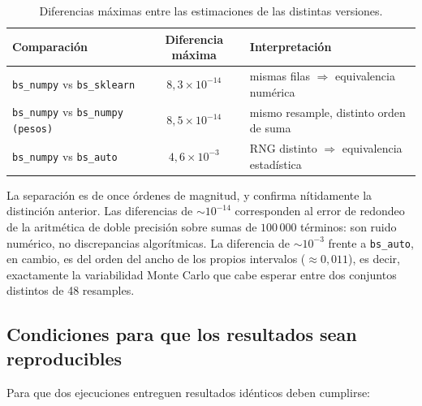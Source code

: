 \documentclass[11pt,letterpaper]{article}
\begin{document}
\begin{table}[H]
\centering
\caption{Diferencias máximas entre las estimaciones de las distintas versiones.}
\label{tab:equivalencia}
\small
\begin{tabular}{lcl}
\toprule
\textbf{Comparación} & \textbf{Diferencia máxima} & \textbf{Interpretación} \\
\midrule
\texttt{bs\_numpy} vs \texttt{bs\_sklearn}       & $8{,}3 \times 10^{-14}$ & mismas filas $\Rightarrow$ equivalencia numérica \\
\texttt{bs\_numpy} vs \texttt{bs\_numpy (pesos)} & $8{,}5 \times 10^{-14}$ & mismo resample, distinto orden de suma \\
\texttt{bs\_numpy} vs \texttt{bs\_auto}          & $4{,}6 \times 10^{-3}$  & RNG distinto $\Rightarrow$ equivalencia estadística \\
\bottomrule
\end{tabular}
\end{table}

La separación es de once órdenes de magnitud, y confirma nítidamente la distinción
anterior. Las diferencias de $\sim 10^{-14}$ corresponden al error de redondeo de la
aritmética de doble precisión sobre sumas de $100\,000$ términos: son ruido numérico,
no discrepancias algorítmicas. La diferencia de $\sim 10^{-3}$ frente a
\texttt{bs\_auto}, en cambio, es del orden del ancho de los propios intervalos
($\approx 0{,}011$), es decir, exactamente la variabilidad Monte Carlo que cabe esperar
entre dos conjuntos distintos de 48 resamples.

\subsection{Condiciones para que los resultados sean reproducibles}

Para que dos ejecuciones entreguen resultados idénticos deben cumplirse:
\end{document}
